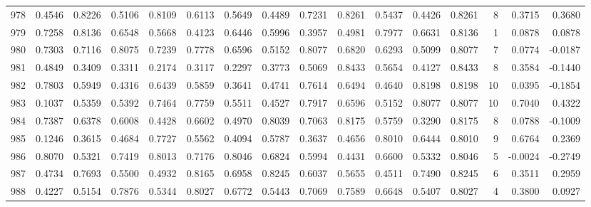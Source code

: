 \begin{tabular}{lrrrrrrrrrrrrrrr}
978 &      0.4546 &  0.8226 &  0.5106 &  0.8109 &  0.6113 &  0.5649 &  0.4489 &  0.7231 &  0.8261 &  0.5437 &   0.4426 &     0.8261 &      8 &                    0.3715 &                     0.3680 \\
979 &      0.7258 &  0.8136 &  0.6548 &  0.5668 &  0.4123 &  0.6446 &  0.5996 &  0.3957 &  0.4981 &  0.7977 &   0.6631 &     0.8136 &      1 &                    0.0878 &                     0.0878 \\
980 &      0.7303 &  0.7116 &  0.8075 &  0.7239 &  0.7778 &  0.6596 &  0.5152 &  0.8077 &  0.6820 &  0.6293 &   0.5099 &     0.8077 &      7 &                    0.0774 &                    -0.0187 \\
981 &      0.4849 &  0.3409 &  0.3311 &  0.2174 &  0.3117 &  0.2297 &  0.3773 &  0.5069 &  0.8433 &  0.5654 &   0.4127 &     0.8433 &      8 &                    0.3584 &                    -0.1440 \\
982 &      0.7803 &  0.5949 &  0.4316 &  0.6439 &  0.5859 &  0.3641 &  0.4741 &  0.7614 &  0.6494 &  0.4640 &   0.8198 &     0.8198 &     10 &                    0.0395 &                    -0.1854 \\
983 &      0.1037 &  0.5359 &  0.5392 &  0.7464 &  0.7759 &  0.5511 &  0.4527 &  0.7917 &  0.6596 &  0.5152 &   0.8077 &     0.8077 &     10 &                    0.7040 &                     0.4322 \\
984 &      0.7387 &  0.6378 &  0.6008 &  0.4428 &  0.6602 &  0.4970 &  0.8039 &  0.7063 &  0.8175 &  0.5759 &   0.3290 &     0.8175 &      8 &                    0.0788 &                    -0.1009 \\
985 &      0.1246 &  0.3615 &  0.4684 &  0.7727 &  0.5562 &  0.4094 &  0.5787 &  0.3637 &  0.4656 &  0.8010 &   0.6444 &     0.8010 &      9 &                    0.6764 &                     0.2369 \\
986 &      0.8070 &  0.5321 &  0.7419 &  0.8013 &  0.7176 &  0.8046 &  0.6824 &  0.5994 &  0.4431 &  0.6600 &   0.5332 &     0.8046 &      5 &                   -0.0024 &                    -0.2749 \\
987 &      0.4734 &  0.7693 &  0.5500 &  0.4932 &  0.8165 &  0.6958 &  0.8245 &  0.6037 &  0.5655 &  0.4511 &   0.7490 &     0.8245 &      6 &                    0.3511 &                     0.2959 \\
988 &      0.4227 &  0.5154 &  0.7876 &  0.5344 &  0.8027 &  0.6772 &  0.5443 &  0.7069 &  0.7589 &  0.6648 &   0.5407 &     0.8027 &      4 &                    0.3800 &                     0.0927 \\

\end{tabular}
